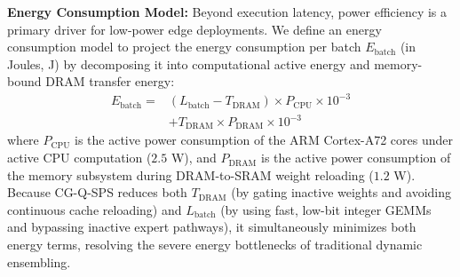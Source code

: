 \textbf{Energy Consumption Model:} Beyond execution latency, power efficiency is a primary driver for low-power edge deployments. We define an energy consumption model to project the energy consumption per batch $E_{\text{batch}}$ (in Joules, J) by decomposing it into computational active energy and memory-bound DRAM transfer energy:
\begin{equation}
  \begin{split}
    E_{\text{batch}} = & \left( L_{\text{batch}} - T_{\text{DRAM}} \right) \times P_{\text{CPU}} \times 10^{-3} \\
    & + T_{\text{DRAM}} \times P_{\text{DRAM}} \times 10^{-3}
  \end{split}
\end{equation}
where $P_{\text{CPU}}$ is the active power consumption of the ARM Cortex-A72 cores under active CPU computation ($2.5$ W), and $P_{\text{DRAM}}$ is the active power consumption of the memory subsystem during DRAM-to-SRAM weight reloading ($1.2$ W). Because CG-Q-SPS reduces both $T_{\text{DRAM}}$ (by gating inactive weights and avoiding continuous cache reloading) and $L_{\text{batch}}$ (by using fast, low-bit integer GEMMs and bypassing inactive expert pathways), it simultaneously minimizes both energy terms, resolving the severe energy bottlenecks of traditional dynamic ensembling.

